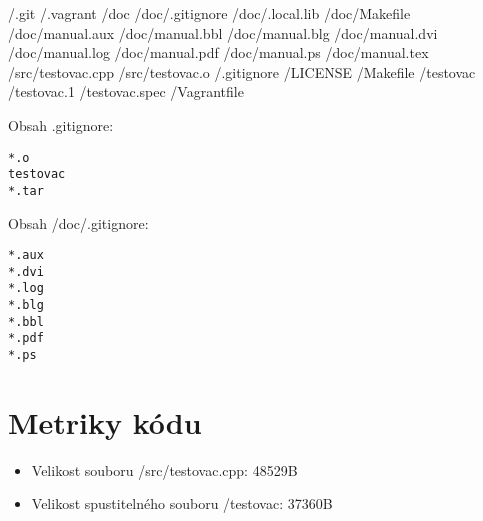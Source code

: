 \documentclass[a4paper,11pt]{article}
\begin{document}
/.git \newline
/.vagrant \newline
/doc \newline
/doc/.gitignore \newline
/doc/.local.lib \newline
/doc/Makefile \newline
/doc/manual.aux \newline
/doc/manual.bbl \newline
/doc/manual.blg \newline
/doc/manual.dvi \newline
/doc/manual.log \newline
/doc/manual.pdf \newline
/doc/manual.ps \newline
/doc/manual.tex \newline
/src/testovac.cpp \newline
/src/testovac.o \newline
/.gitignore \newline
/LICENSE \newline
/Makefile \newline
/testovac \newline
/testovac.1 \newline
/testovac.spec \newline
/Vagrantfile \newline

Obsah .gitignore:

\begin{lstlisting}[frame=single,breaklines]
*.o
testovac
*.tar
\end{lstlisting}

Obsah /doc/.gitignore:

\begin{lstlisting}[frame=single,breaklines]
*.aux
*.dvi
*.log
*.blg
*.bbl
*.pdf
*.ps
\end{lstlisting}

\section*{Metriky kódu}
\begin{itemize}
  \item Velikost souboru /src/testovac.cpp: 48529B
  \item Velikost spustitelného souboru /testovac: 37360B
\end{itemize}
\end{document}
